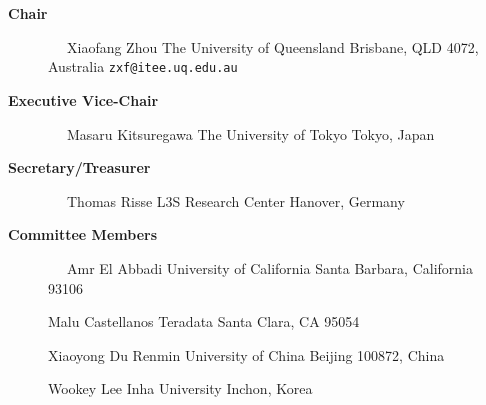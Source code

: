 \documentclass[10pt,twocolumn]{article}
\begin{document}
\begin{description}

\item[{\bf Chair}] 
\verb-  -                     	\newline
Xiaofang Zhou  \newline
The University of Queensland  \newline
Brisbane, QLD 4072, Australia  \newline
\verb+zxf@itee.uq.edu.au+    \newline
\vspace{-.4cm}

\item[{\bf Executive Vice-Chair}] 
\verb-  -                      \newline
Masaru Kitsuregawa 			\newline
The University of Tokyo        \newline
Tokyo, Japan				\newline
\vspace{-.4cm}

\item[{\bf Secretary/Treasurer}] 
\verb-  -                      \newline
Thomas Risse                   \newline
L3S Research Center 		\newline
Hanover, Germany		\newline
\verb-  -                      \newline
\vspace{-.7cm}

\item[{\bf Committee Members}]
\verb-  -                      \newline
Amr El Abbadi     \newline
University of California	\newline
Santa Barbara, California 93106	
\vspace{.05cm}

Malu Castellanos		\newline
Teradata \newline
Santa Clara, CA 95054
\vspace{.05cm}

Xiaoyong Du	\newline
Renmin University of China	\newline	 
Beijing 100872, China	
\vspace{.05cm}

Wookey Lee		\newline
Inha University	\newline	 
Inchon, Korea
\vspace{.05cm}	


\end{description}
\end{document}
